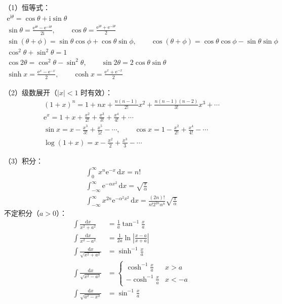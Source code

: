 （1）恒等式：
\begin{gather*}
\mathrm{e}^{\mathrm{i}\theta} = \cos\theta + \mathrm{i}\sin\theta\\
\sin\theta = \frac{\mathrm{e}^{\mathrm{i}\theta}-\mathrm{e}^{-\mathrm{i}\theta}}{2\mathrm{i}},\qquad
\cos\theta = \frac{\mathrm{e}^{\mathrm{i}\theta}+\mathrm{e}^{-\mathrm{i}\theta}}{2}\\
\sin(\theta+\phi) = \sin\theta\cos\phi+\cos\theta\sin\phi,\qquad
\cos(\theta+\phi) = \cos\theta\cos\phi-\sin\theta\sin\phi\\
\cos^{2}\theta+\sin^{2}\theta = 1\\
\cos2\theta = \cos^{2}\theta-\sin^{2}\theta,\qquad
\sin2\theta = 2\cos\theta\sin\theta\\
\sinh x = \frac{\mathrm{e}^{x}-\mathrm{e}^{-x}}{2},\qquad
\cosh x = \frac{\mathrm{e}^{x}+\mathrm{e}^{-x}}{2}
\end{gather*}

（2）级数展开（$|x|<1$ 时有效）：
\begin{gather*}
(1+x)^{n} = 1+nx+\frac{n(n-1)}{2!}x^{2}+\frac{n(n-1)(n-2)}{3!}x^{3}+\cdots\\
\mathrm{e}^{x} = 1+x+\frac{x^{2}}{2!}+\frac{x^{3}}{3!}+\frac{x^{4}}{4!}+\cdots\\
\sin x = x-\frac{x^{3}}{3!}+\frac{x^{5}}{5!}-\cdots,\qquad
\cos x = 1-\frac{x^{2}}{2!}+\frac{x^{4}}{4!}-\cdots\\
\log(1+x) = x-\frac{x^{2}}{2}+\frac{x^{3}}{3}-\cdots
\end{gather*}

（3）积分：
\begin{gather*}
\int_{0}^{\infty}x^{n}\mathrm{e}^{-x}\,\mathrm{d}x = n!\\
\int_{-\infty}^{\infty}\mathrm{e}^{-\alpha x^{2}}\,\mathrm{d}x = \sqrt{\frac{\pi}{\alpha}}\\
\int_{-\infty}^{\infty}x^{2n}\mathrm{e}^{-\alpha^{2}x^{2}}\,\mathrm{d}x = \frac{(2n)!}{n!2^{2n}\alpha^{n}}\sqrt{\frac{\pi}{\alpha}}
\end{gather*}
不定积分（$a>0$）：
\begin{equation*}
\begin{aligned}
\int\frac{\mathrm{d}x}{x^{2}+a^{2}} &= \frac{1}{a}\tan^{-1}\frac{x}{a}\\
\int\frac{\mathrm{d}x}{x^{2}-a^{2}} &= \frac{1}{2a}\ln\left|\frac{x-a}{x+a}\right|\\
\int\frac{\mathrm{d}x}{\sqrt{x^{2}+a^{2}}} &= \sinh^{-1}\frac{x}{a}\\
\int\frac{\mathrm{d}x}{\sqrt{x^{2}-a^{2}}} &= \begin{cases} \cosh^{-1}\frac{x}{a} & x>a\\ -\cosh^{-1}\frac{x}{a} & x<-a \end{cases}\\
\int\frac{\mathrm{d}x}{\sqrt{a^{2}-x^{2}}} &= \sin^{-1}\frac{x}{a}
\end{aligned}\tag{G.1}
\end{equation*}

